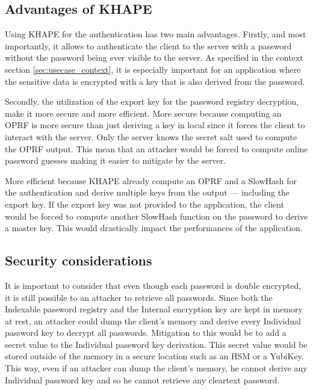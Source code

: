 ﻿\documentclass[../report.tex]{subfiles}
\begin{document}
\subsection{Advantages of KHAPE}
Using KHAPE for the authentication has two main advantages.
Firstly, and most importantly, it allows to authenticate the client to the server with a password without the password being ever visible to the server. As specified in the context section \ref{sec:usecase_context}, it is especially important for an application where the sensitive data is encrypted with a key that is also derived from the password.

Secondly, the utilization of the export key for the password registry decryption, make it more secure and more efficient.
More secure because computing an OPRF is more secure than just deriving a key in local since it forces the client to interact with the server. Only the server knows the secret salt used to compute the OPRF output. 
This mean that an attacker would be forced to compute online password guesses making it easier to mitigate by the server.

More efficient because KHAPE already compute an OPRF and a SlowHash for the authentication and derive multiple keys from the output --- including the export key.
If the export key was not provided to the application, the client would be forced to compute another SlowHash function on the password to derive a master key. This would drastically impact the performances of the application.


\subsection{Security considerations}
It is important to consider that even though each password is double encrypted, it is still possible to an attacker to retrieve all passwords. Since both the Indexable password registry and the Internal encryption key are kept in memory at rest, an attacker could dump the client's memory and derive every Individual password key to decrypt all passwords.
Mitigation to this would be to add a secret value to the Individual password key derivation. This secret value would be stored outside of the memory in a secure location such as an HSM or a YubiKey. This way, even if an attacker can dump the client's memory, he cannot derive any Individual password key and so he cannot retrieve any cleartext password. 

% 
% 
% 
\end{document}
